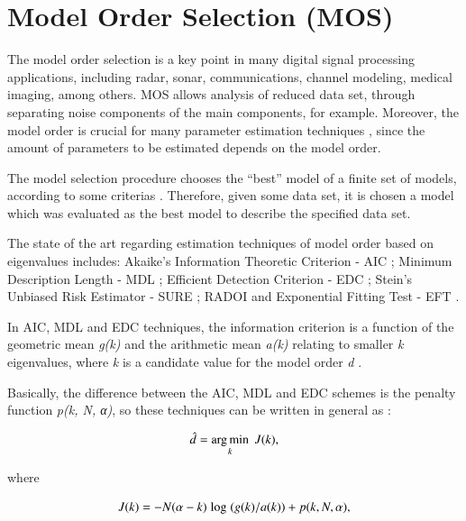 \documentclass[review]{elsarticle}
\DeclareMathOperator*{\argmin}{arg\,min}
\begin{document}
\appendix

\section{Model Order Selection (MOS)}
\label{sec:mos}
The model order selection is a key point in many digital signal processing applications, including radar, sonar, communications, channel modeling, medical imaging, among others. MOS allows analysis of reduced data set, through separating noise components of the main components, for example. Moreover, the model order is crucial for many parameter estimation techniques \cite{da2009comparison}, since the amount of parameters to be estimated depends on the model order.

The model selection procedure chooses the ``best'' model of a finite set of models, according to some criterias \cite{rajan1997model}. Therefore, given some data set, it is chosen a model which was evaluated as the best model to describe the specified data set.

The state of the art regarding estimation techniques of model order based on eigenvalues includes: Akaike's Information Theoretic Criterion - AIC \cite{akaike1974new,wax1985detection}; Minimum Description Length - MDL \cite{barron1998minimum,wax1985detection}; Efficient Detection Criterion - EDC \cite{zhao1986detection}; Stein's Unbiased Risk Estimator - SURE \cite{ulfarsson2008rank}; RADOI \cite{radoi2004new} and Exponential Fitting Test - EFT \cite{grouffaud1996some,quinlan2006model,david2011blind}.

In AIC, MDL and EDC techniques, the information criterion is a function of the geometric mean \emph{g(k)} and the arithmetic mean \emph{a(k)} relating to smaller \emph{k} eigenvalues, where \emph{k} is a candidate value for the model order \emph{d} \cite{da2009comparison}.

Basically, the difference between the AIC, MDL and EDC schemes is the penalty function \emph{p(k, N, α)}, so these techniques can be written in general as \cite{da2009comparison}:

\begin{equation}\label{eq:eq1}
\hat{d} = \argmin\limits_k \hspace{1 mm} J(k), 
\end{equation}

where

\begin{equation}\label{eq:eq2}
J(k) = -N(\alpha - k) \hspace{1 mm} {\rm log} \hspace{1 mm} (g(k)/a(k)) + p(k,N,\alpha),
\end{equation}
\end{document}
